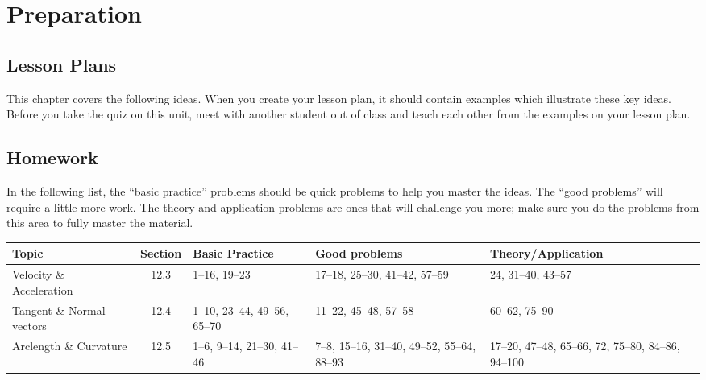 \section{Preparation}

\subsection{Lesson Plans}

This chapter covers the following ideas. When you create your lesson plan, it should contain examples which illustrate these key ideas. Before you take the quiz on this unit, meet with another student out of class and teach each other from the examples on your lesson plan. 





\subsection{Homework}

In the following list, the ``basic practice'' problems should be quick
problems to help you master the ideas.  The ``good problems'' will
require a little more work.  The theory and application problems are
ones that will challenge you more; make sure you do the problems from
this area to fully master the material.  

\begin{center}
  \begin{tabular}{p{1in}cp{1.3in}p{1.3in}p{1.3in}}\toprule
    Topic & Section & Basic Practice & Good problems & Theory/Application \\\midrule
    Velocity \& Acceleration & 12.3 & 1--16, 19--23 & 17--18, 25--30, 41--42, 57--59 & 24, 31--40, 43--57 \\
    Tangent \& Normal vectors & 12.4 & 1--10, 23--44, 49--56, 65--70 & 11--22, 45--48, 57--58 & 60--62, 75--90 \\
    Arclength \& Curvature & 12.5 & 1--6, 9--14, 21--30, 41--46 & 7--8, 15--16, 31--40, 49--52, 55--64, 88--93 & 17--20, 47--48, 65--66, 72, 75--80, 84--86, 94--100
    \\\bottomrule
  \end{tabular}
\end{center}

